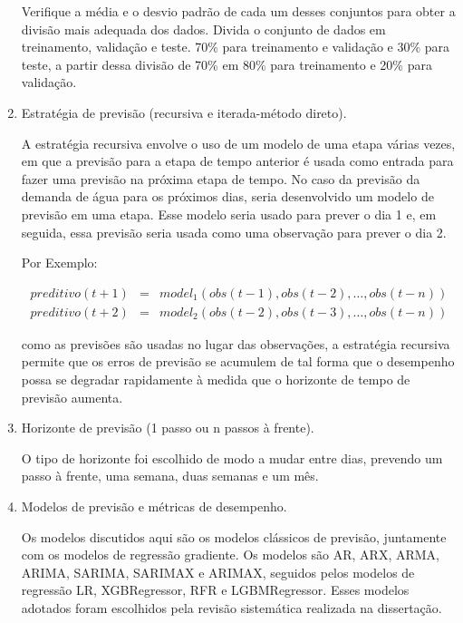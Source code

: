 \begin{enumerate}[start=1, label = {\textbf{Etapa} \arabic* } ]
    	Verifique a média e o desvio padrão de cada um desses conjuntos para obter a divisão mais adequada dos dados. Divida o conjunto de dados em treinamento, validação e teste. 70\% para treinamento e validação e 30\% para teste, a partir dessa divisão de 70\% em 80\% para treinamento e 20\% para validação.
    	
    	
    	\item Estratégia de previsão (recursiva e iterada-método direto). \label{etp:5}
    	
    	A estratégia recursiva envolve o uso de um modelo de uma etapa várias vezes, em que a previsão para a etapa de tempo anterior é usada como entrada para fazer uma previsão na próxima etapa de tempo.    	
    	No caso da previsão da demanda de água para os próximos dias, seria desenvolvido um modelo de previsão em uma etapa. Esse modelo seria usado para prever o dia 1 e, em seguida, essa previsão seria usada como uma observação para prever o dia 2.
    	    		 
    	Por Exemplo:
    	
    	\begin{eqnarray}
    	preditivo(t+1) &=& model_1(obs(t-1), obs(t-2), \ldots, obs(t-n))\\
    	preditivo(t+2) &=& model_2(obs(t-2), obs(t-3), \ldots, obs(t-n))   	
    	\end{eqnarray}
    	
    	 como as previsões são usadas no lugar das observações, a estratégia recursiva permite que os erros de previsão se acumulem de tal forma que o desempenho possa se degradar rapidamente à medida que o horizonte de tempo de previsão aumenta.
    	
    	
    	\item Horizonte de previsão (1 passo ou n passos à frente). \label{etp:6}
    	
    	O tipo de horizonte foi escolhido de modo a mudar entre dias, prevendo um passo à frente, uma semana, duas semanas e um mês.
    	
    	
    	\item Modelos de previsão e métricas de desempenho. \label{etp:7}
    	
    	Os modelos discutidos aqui são os modelos clássicos de previsão, juntamente com os modelos de regressão gradiente. Os modelos são AR, ARX, ARMA, ARIMA, SARIMA, SARIMAX e ARIMAX, seguidos pelos modelos de regressão LR, XGBRegressor, RFR e LGBMRegressor. Esses modelos adotados foram escolhidos pela revisão sistemática realizada na dissertação.
    	

\end{enumerate}
